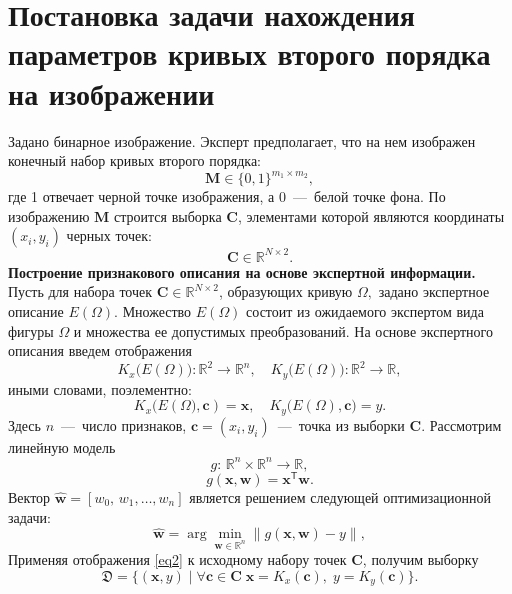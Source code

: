 \documentclass[12pt, twoside]{article}
\numberwithin{equation}{section}
\begin{document}
\section{Постановка задачи нахождения параметров кривых второго порядка на изображении}
Задано бинарное изображение. Эксперт предполагает, что на нем изображен конечный набор кривых второго порядка: $$ \mathbf{M} \in \{0, 1 \}^{m_1\times m_2},$$
где 1 отвечает черной точке изображения, а 0~---~белой точке фона. По изображению $\mathbf{M}$ строится выборка $\mathbf{C}$, элементами которой являются координаты $(x_i, y_i)$ черных точек: $$\mathbf{C} \in \mathbb{R}^{N \times 2}.$$
\textbf{Построение признакового описания на основе экспертной информации.} Пусть для набора точек $\mathbf{C} \in \mathbb{R}^{N \times 2}$, образующих кривую $\Omega, $ задано экспертное описание $E(\Omega)$. Множество $E(\Omega)$ состоит из ожидаемого экспертом вида фигуры $\Omega$ и множества ее допустимых преобразований. На основе экспертного описания введем отображения 
\begin{equation}\label{eq1}
K_{x}\bigl(E(\Omega)\bigr): \mathbb{R}^{2} \rightarrow \mathbb{R}^{n}, \quad K_{y}\bigl(E(\Omega)\bigr): \mathbb{R}^{2} \rightarrow \mathbb{R},
\end{equation} 
иными словами, поэлементно:
\begin{equation}\label{eq2}
K_{x}\bigl(E(\Omega\bigr), \mathbf{c}) = \mathbf{x}, \quad  K_{y}\bigl(E(\Omega), \mathbf{c}\bigr) = y
.\end{equation} 
Здесь $n$~---~число признаков, $\mathbf{c} = (x_i, y_i)$~---~точка из выборки $\mathbf{C}$. Рассмотрим линейную модель
\begin{equation}
g: \, \mathbb{R}^n \times \mathbb{R}^n \rightarrow \mathbb{R},
\end{equation}
\begin{equation}\label{eq3}
g(\mathbf{x}, \mathbf{w}) = \mathbf{x}^\mathsf{T} \mathbf{w}.
\end{equation}
Вектор $\hat{\mathbf{w}}= [w_0, \, w_1, \dots, w_n]$ является решением следующей оптимизационной задачи:  \begin{equation} \hat{\mathbf{w}} = \arg\min_{\mathbf{w}\in\mathbb{R}^n} \|g(\mathbf{x}, \mathbf{w}) - y \|, \end{equation} 
Применяя отображения \eqref{eq2} к исходному набору точек $\mathbf{C}$, получим выборку 
\begin{equation}\label{eq4}
    \mathfrak{D} = \{(\mathbf{x}, y) \; | \; \forall \mathbf{c} \in \mathbf{C} \; \mathbf{x} = K_x(\mathbf{c}), \; y = K_y(\mathbf{c}) \}.
    \end{equation} 
\end{document}
